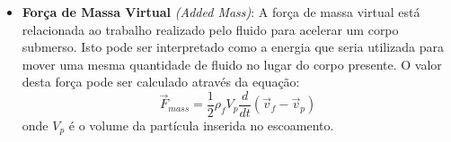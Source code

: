 \begin{itemize}
    \item \textbf{Força de Massa Virtual} \textit{(Added Mass)}:
        A força de massa virtual está relacionada ao trabalho realizado pelo fluido para acelerar um corpo submerso.
        Isto pode ser interpretado como a energia que seria utilizada para mover uma mesma quantidade de fluido no lugar do corpo presente.
        O valor desta força pode ser calculado através da equação:
        \begin{equation}
            \vec{F}_{mass} = \dfrac{1}{2} \rho_f V_p \dfrac{d}{dt}\left(\vec{v}_{f} - \vec{v}_{p} \right)
            \label{mass}
        \end{equation}
        onde $V_p$ é o volume da partícula inserida no escoamento.
\end{itemize}